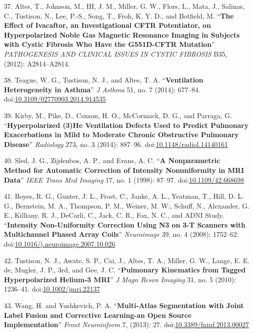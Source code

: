 \documentclass[11pt,]{article}
\begin{document}
\hypertarget{ref-Altes:2012aa}{}
37. Altes, T., Johnson, M., III, J. M., Miller, G. W., Flors, L., Mata,
J., Salinas, C., Tustison, N., Lee, P.-S., Song, T., Froh, K. Y. D., and
Botfield, M. ``\textbf{The Effect of Ivacaftor, an Investigational CFTR
Potentiator, on Hyperpolarized Noble Gas Magnetic Resonance Imaging in
Subjects with Cystic Fibrosis Who Have the G551D-CFTR Mutation}''
\emph{PATHOGENESIS AND CLINICAL ISSUES IN CYSTIC FIBROSIS} B35, (2012):
A2814--A2814.

\hypertarget{ref-Teague:2014aa}{}
38. Teague, W. G., Tustison, N. J., and Altes, T. A.
``\textbf{Ventilation Heterogeneity in Asthma}'' \emph{J Asthma} 51, no.
7 (2014): 677--84.
doi:\href{https://doi.org/10.3109/02770903.2014.914535}{10.3109/02770903.2014.914535}

\hypertarget{ref-Kirby:2014aa}{}
39. Kirby, M., Pike, D., Coxson, H. O., McCormack, D. G., and Parraga,
G. ``\textbf{Hyperpolarized (3)He Ventilation Defects Used to Predict
Pulmonary Exacerbations in Mild to Moderate Chronic Obstructive
Pulmonary Disease}'' \emph{Radiology} 273, no. 3 (2014): 887--96.
doi:\href{https://doi.org/10.1148/radiol.14140161}{10.1148/radiol.14140161}

\hypertarget{ref-Sled:1998aa}{}
40. Sled, J. G., Zijdenbos, A. P., and Evans, A. C. ``\textbf{A
Nonparametric Method for Automatic Correction of Intensity Nonuniformity
in MRI Data}'' \emph{IEEE Trans Med Imaging} 17, no. 1 (1998): 87--97.
doi:\href{https://doi.org/10.1109/42.668698}{10.1109/42.668698}

\hypertarget{ref-Boyes:2008aa}{}
41. Boyes, R. G., Gunter, J. L., Frost, C., Janke, A. L., Yeatman, T.,
Hill, D. L. G., Bernstein, M. A., Thompson, P. M., Weiner, M. W.,
Schuff, N., Alexander, G. E., Killiany, R. J., DeCarli, C., Jack, C. R.,
Fox, N. C., and ADNI Study. ``\textbf{Intensity Non-Uniformity
Correction Using N3 on 3-T Scanners with Multichannel Phased Array
Coils}'' \emph{Neuroimage} 39, no. 4 (2008): 1752--62.
doi:\href{https://doi.org/10.1016/j.neuroimage.2007.10.026}{10.1016/j.neuroimage.2007.10.026}

\hypertarget{ref-Tustison:2010aa}{}
42. Tustison, N. J., Awate, S. P., Cai, J., Altes, T. A., Miller, G. W.,
Lange, E. E. de, Mugler, J. P., 3rd, and Gee, J. C. ``\textbf{Pulmonary
Kinematics from Tagged Hyperpolarized Helium-3 MRI}'' \emph{J Magn Reson
Imaging} 31, no. 5 (2010): 1236--41.
doi:\href{https://doi.org/10.1002/jmri.22137}{10.1002/jmri.22137}

\hypertarget{ref-Wang:2013aa}{}
43. Wang, H. and Yushkevich, P. A. ``\textbf{Multi-Atlas Segmentation
with Joint Label Fusion and Corrective Learning-an Open Source
Implementation}'' \emph{Front Neuroinform} 7, (2013): 27.
doi:\href{https://doi.org/10.3389/fninf.2013.00027}{10.3389/fninf.2013.00027}
\end{document}
